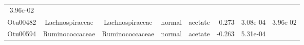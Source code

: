 \documentclass[11pt,]{article}
\begin{document}
\begin{longtable}[]{@{}cccccccc@{}}
\begin{minipage}[t]{0.08\columnwidth}
3.96e-02\strut
\end{minipage}\tabularnewline
\begin{minipage}[t]{0.08\columnwidth}\centering\strut
Otu00482\strut
\end{minipage} & \begin{minipage}[t]{0.15\columnwidth}\centering\strut
Lachnospiraceae\strut
\end{minipage} & \begin{minipage}[t]{0.15\columnwidth}\centering\strut
Lachnospiraceae\strut
\end{minipage} & \begin{minipage}[t]{0.08\columnwidth}\centering\strut
normal\strut
\end{minipage} & \begin{minipage}[t]{0.09\columnwidth}\centering\strut
acetate\strut
\end{minipage} & \begin{minipage}[t]{0.07\columnwidth}\centering\strut
-0.273\strut
\end{minipage} & \begin{minipage}[t]{0.08\columnwidth}\centering\strut
3.08e-04\strut
\end{minipage} & \begin{minipage}[t]{0.08\columnwidth}\centering\strut
3.96e-02\strut
\end{minipage}\tabularnewline
\begin{minipage}[t]{0.08\columnwidth}\centering\strut
Otu00594\strut
\end{minipage} & \begin{minipage}[t]{0.15\columnwidth}\centering\strut
Ruminococcaceae\strut
\end{minipage} & \begin{minipage}[t]{0.15\columnwidth}\centering\strut
Ruminococcaceae\strut
\end{minipage} & \begin{minipage}[t]{0.08\columnwidth}\centering\strut
normal\strut
\end{minipage} & \begin{minipage}[t]{0.09\columnwidth}\centering\strut
acetate\strut
\end{minipage} & \begin{minipage}[t]{0.07\columnwidth}\centering\strut
-0.263\strut
\end{minipage} & \begin{minipage}[t]{0.08\columnwidth}\centering\strut
5.31e-04\strut
\end{minipage} & \begin{minipage}[t]{0.08\columnwidth}\centering\strut

\end{minipage}
\end{longtable}
\end{document}
